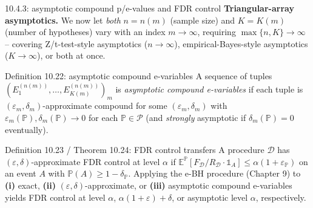 \documentclass[aspectratio=169,10pt]{beamer}
\newcommand{\E}{\mathbb{E}}
\newcommand{\Pb}{\mathbb{P}}
\newcommand{\calP}{\mathcal{P}}
\newcommand{\calD}{\mathcal{D}}
\begin{document}
\begin{frame}{10.4.3: asymptotic compound p/e-values and FDR control}
  \textbf{Triangular-array asymptotics.} We now let \emph{both} $n=n(m)$ (sample size) and $K=K(m)$ (number of hypotheses) vary with an index $m\to\infty$, requiring $\max\{n,K\}\to\infty$ -- covering Z/t-test-style asymptotics ($n\to\infty$), empirical-Bayes-style asymptotics ($K\to\infty$), or both at once.
  \begin{block}{Definition 10.22: asymptotic compound e-variables}
    A sequence of tuples $(E_1^{(n(m))},\dots,E_{K(m)}^{(n(m))})_{m}$ is \emph{asymptotic compound e-variables} if each tuple is $(\varepsilon_m,\delta_m)$-approximate compound for some $(\varepsilon_m,\delta_m)$ with $\varepsilon_m(\Pb),\delta_m(\Pb)\to0$ for each $\Pb\in\calP$ (and \emph{strongly} asymptotic if $\delta_m(\Pb)=0$ eventually).
  \end{block}
  \begin{block}{Definition 10.23 / Theorem 10.24: FDR control transfers}
    A procedure $\calD$ has $(\varepsilon,\delta)$-approximate FDR control at level $\alpha$ if $\E^{\Pb}[F_\calD/R_\calD \cdot \mathbb{1}_A]\leq \alpha(1+\varepsilon_\Pb)$ on an event $A$ with $\Pb(A)\geq1-\delta_\Pb$. Applying the e-BH procedure (Chapter 9) to \textbf{(i)} exact, \textbf{(ii)} $(\varepsilon,\delta)$-approximate, or \textbf{(iii)} asymptotic compound e-variables yields FDR control at level $\alpha$, $\alpha(1+\varepsilon)+\delta$, or asymptotic level $\alpha$, respectively.
  \end{block}
\end{frame}
\end{document}
